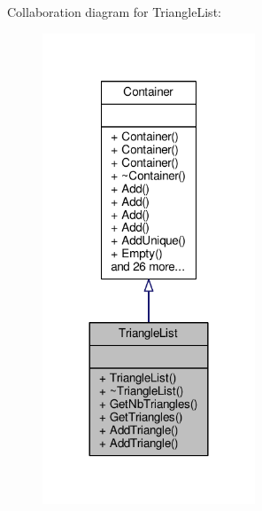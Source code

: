 Collaboration diagram for Triangle\+List\+:
\nopagebreak
\begin{figure}[H]
\begin{center}
\leavevmode
\includegraphics[width=180pt]{d4/d90/classTriangleList__coll__graph}
\end{center}
\end{figure}
